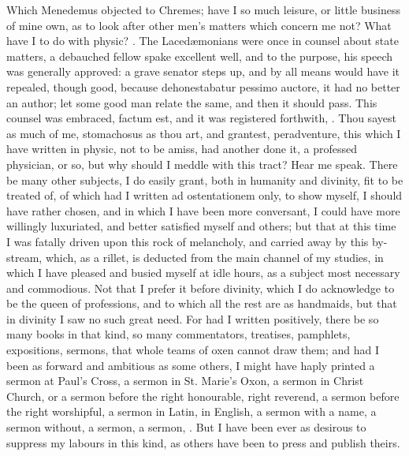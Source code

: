 {Which Menedemus objected to Chremes; have I so much leisure, or little
business of mine own, as to look after other men's matters which
concern me not? What have I to do with physic? . The Laced\ae{}monians were once in counsel about
state matters, a debauched fellow spake excellent well, and to the
purpose, his speech was generally approved: a grave senator steps up,
and by all means would have it repealed, though good, because
dehonestabatur pessimo auctore, it had no better an author; let some
good man relate the same, and then it should pass. This counsel was
embraced, factum est, and it was registered forthwith, . Thou sayest as much of me,
stomachosus as thou art, and grantest, peradventure, this which I have
written in physic, not to be amiss, had another done it, a professed
physician, or so, but why should I meddle with this tract? Hear me
speak. There be many other subjects, I do easily grant, both in
humanity and divinity, fit to be treated of, of which had I written ad
ostentationem only, to show myself, I should have rather chosen, and in
which I have been more conversant, I could have more willingly
luxuriated, and better satisfied myself and others; but that at this
time I was fatally driven upon this rock of melancholy, and carried
away by this by-stream, which, as a rillet, is deducted from the main
channel of my studies, in which I have pleased and busied myself at
idle hours, as a subject most necessary and commodious. Not that I
prefer it before divinity, which I do acknowledge to be the queen of
professions, and to which all the rest are as handmaids, but that in
divinity I saw no such great need. For had I written positively, there
be so many books in that kind, so many commentators, treatises,
pamphlets, expositions, sermons, that whole teams of oxen cannot draw
them; and had I been as forward and ambitious as some others, I might
have haply printed a sermon at Paul's Cross, a sermon in St. Marie's
Oxon, a sermon in Christ Church, or a sermon before the right
honourable, right reverend, a sermon before the right worshipful, a
sermon in Latin, in English, a sermon with a name, a sermon without, a
sermon, a sermon, \etc. But I have been ever as desirous to suppress my
labours in this kind, as others have been to press and publish theirs.

}
